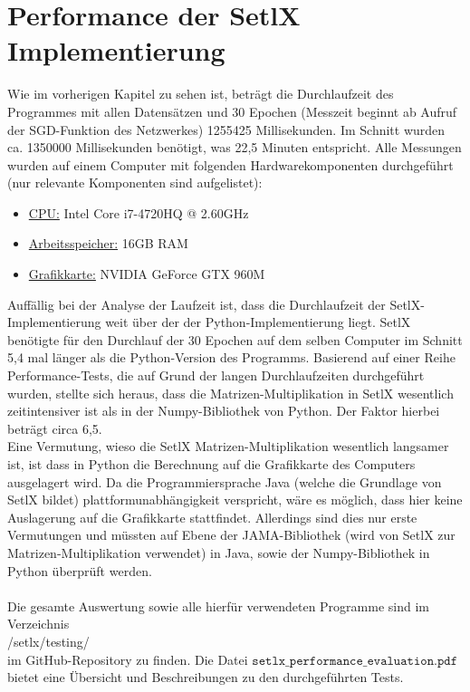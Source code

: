 \section{Performance der SetlX Implementierung}
Wie im vorherigen Kapitel zu sehen ist, beträgt die Durchlaufzeit des Programmes mit allen Datensätzen und 30 Epochen (Messzeit beginnt ab Aufruf der SGD-Funktion des Netzwerkes) 1255425 Millisekunden. Im Schnitt wurden ca. 1350000 Millisekunden benötigt, was 22,5 Minuten entspricht. Alle Messungen wurden auf einem Computer mit folgenden Hardwarekomponenten durchgeführt (nur relevante Komponenten sind aufgelistet):
\begin{itemize}
	\item \underline{CPU:} Intel Core i7-4720HQ @ 2.60GHz
	\item \underline{Arbeitsspeicher:} 16GB RAM
	\item \underline{Grafikkarte:} NVIDIA GeForce GTX 960M
\end{itemize}
Auffällig bei der Analyse der Laufzeit ist, dass die Durchlaufzeit der SetlX-Implementierung weit über der der Python-Implementierung liegt. SetlX benötigte für den Durchlauf der 30 Epochen auf dem selben Computer im Schnitt 5,4 mal länger als die Python-Version des Programms. Basierend auf einer Reihe Performance-Tests, die auf Grund der langen Durchlaufzeiten durchgeführt wurden, stellte sich heraus, dass die Matrizen-Multiplikation in SetlX wesentlich zeitintensiver ist als in der Numpy-Bibliothek von Python. Der Faktor hierbei beträgt circa 6,5. \\
Eine Vermutung, wieso die SetlX Matrizen-Multiplikation wesentlich langsamer ist, ist dass in Python die Berechnung auf die Grafikkarte des Computers ausgelagert wird. Da die Programmiersprache Java (welche die Grundlage von SetlX bildet) plattformunabhängigkeit verspricht, wäre es möglich, dass hier keine Auslagerung auf die Grafikkarte stattfindet. Allerdings sind dies nur erste Vermutungen und müssten auf Ebene der JAMA-Bibliothek (wird von SetlX zur Matrizen-Multiplikation verwendet) in Java, sowie der Numpy-Bibliothek in Python überprüft werden. \\ \\
Die gesamte Auswertung sowie alle hierfür verwendeten Programme sind im Verzeichnis
\\[0.2cm]
\hspace*{1.3cm}
/setlx/testing/
\\[0.2cm]
im GitHub-Repository zu finden. Die Datei $\mathtt{setlx\_performance\_evaluation.pdf}$ bietet eine Übersicht und Beschreibungen zu den durchgeführten Tests.